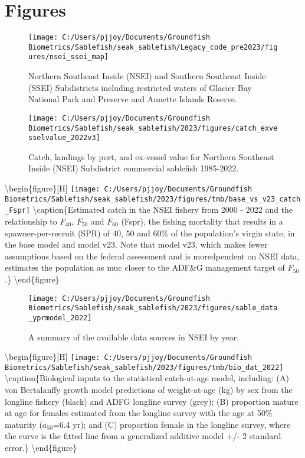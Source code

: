 \documentclass[
]{article}
\begin{document}
\newpage

\hypertarget{figures}{%
\section{Figures}\label{figures}}

\begin{figure}[H]
\texttt{[image: C:/Users/pjjoy/Documents/Groundfish Biometrics/Sablefish/seak\_sablefish/Legacy\_code\_pre2023/figures/nsei\_ssei\_map]} \caption{Northern Southeast Inside (NSEI) and Southern Southeast Inside (SSEI) Subdistricts including restricted waters of Glacier Bay National Park and Preserve and Annette Islands Reserve.}\label{fig:nseimap}
\end{figure}

\begin{figure}[H]
\texttt{[image: C:/Users/pjjoy/Documents/Groundfish Biometrics/Sablefish/seak\_sablefish/2023/figures/catch\_exvesselvalue\_2022v3]} \caption{Catch, landings by port, and ex-vessel value for Northern Southeast Inside (NSEI) Subdistrict commercial sablefish 1985-2022.}\label{fig:catch}
\end{figure}

\textbackslash begin\{figure\}{[}H{]}
\texttt{[image: C:/Users/pjjoy/Documents/Groundfish Biometrics/Sablefish/seak\_sablefish/2023/figures/tmb/base\_vs\_v23\_catch\_Fspr]} \textbackslash caption\{Estimated catch in the NSEI fishery from 2000 - 2022 and the relationship to \(F_{40}\), \(F_{50}\) and \(F_{60}\) (Fspr), the fishing mortality that results in a spawner-per-recruit (SPR) of 40, 50 and 60\% of the population's virgin state, in the base model and model v23. Note that model v23, which makes fewer assumptions based on the federal assessment and is moredpendent on NSEI data, estimates the population as muc closer to the ADF\&G management target of \(F_{50}\).\}\label{fig:Fsprcomp}
\textbackslash end\{figure\}

\begin{figure}[H]
\texttt{[image: C:/Users/pjjoy/Documents/Groundfish Biometrics/Sablefish/seak\_sablefish/2023/figures/sable\_data\_yprmodel\_2022]} \caption{A summary of the available data sources in NSEI by year.}\label{fig:datsrc}
\end{figure}

\textbackslash begin\{figure\}{[}H{]}
\texttt{[image: C:/Users/pjjoy/Documents/Groundfish Biometrics/Sablefish/seak\_sablefish/2023/figures/tmb/bio\_dat\_2022]} \textbackslash caption\{Biological inputs to the statistical catch-at-age model, including: (A) von Bertalanffy growth model predictions of weight-at-age (kg) by sex from the longline fishery (black) and ADFG longline survey (grey); (B) proportion mature at age for females estimated from the longline survey with the age at 50\% maturity (\(a_{50}\)=6.4 yr); and (C) proportion female in the longline survey, where the curve is the fitted line from a generalized additive model +/- 2 standard error.\}\label{fig:bioinputs}
\textbackslash end\{figure\}
\end{document}
